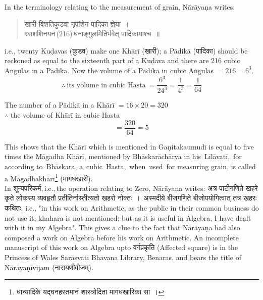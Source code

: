\documentclass[11pt, openany]{book}
\begin{document}
\newpage%

 In the terminology relating to the measurement of grain, 
Nārāyaṇa writes: 
\begin{quote}
    \qt 
    खारी विंशतिकुडवा नृपांशेन पादिका ज्ञेया~। \\
 रसशशिनयन\textendash \,(216)\textendash \,घनाङ्गुलमितिर्भवेत् पादिकायाश्च~॥
\end{quote}
 
i.e., twenty Kuḍavas (कुडव) make one Khārī (खारी); 
a Pādikā (पादिका) should be reckoned as equal to the sixteenth 
part of a Kuḍava and there are 216 cubic Aṅgulas in a Pādikā. 
Now the volume of a Pādikā in cubic Aṅgulas $= 216 = 6^{3}$.
 \begin{equation*}
     \therefore\ \text{its volume in cubic Hasta}\ = \dfrac{6^{3}}{24^{3}} = \dfrac{1}{4^{3}} = \dfrac{1}{64}
 \end{equation*}
      
 The number of a Pādikā in a Khārī $= 16 \times 20 = 320$ \\
\indent $\therefore$\; the volume of Khārī in cubic Hasta 
\begin{equation*}
    = \dfrac{320}{64} = 5 
\end{equation*}

 This shows that the Khārī which is mentioned in Gaṇitakaumudī is equal to five times the Māgadha Khārī, mentioned 
by Bhāskarāchārya in his \,Līlāvatī, \,for \,according to \,Bhāskara, a \,cubic \,Hasta, \,when \,used \,for measuring grain, is called a 
Māgadhakhārī\renewcommand{\thefootnote}{6}\footnote{धान्यादिके यद्घनहस्तमानं शास्त्रोदिता मागधखारिका सा~।} (मागधखारी). \\

\vspace{-2mm}
In शून्यपरिकर्म,\,i.e.,\,the operation relating to Zero, Nārāyaṇa writes: {\qt अत्र पाटीगणिते खहरे कृते लोकस्य व्यवहृतौ
प्रतीतिर्नास्तीत्यतो खहरो नोक्तः~।~अस्मदीये बीजगणिते बीजोपयोगित्वात् तत्र खहरः कथितः.} i.e., "in this
work 
on Arithmetic, as the public in their common business do not 
use it, khahara is not mentioned; but as it is useful in 
Algebra, I have dealt with it in my Algebra". This gives a 
clue to the fact that Nārāyaṇa had also composed a work 
on Algebra before his work on Arithmetic. An incomplete 
manuscript of this work on Algebra upto वर्गप्रकृति (Affected 
square) is in the Princess of Wales Sarasvati Bhavana 
Library, Benaras, and bears the title of Nārāyaṇīvījam 
(नारायणीवीजम्).\\
\end{document}
